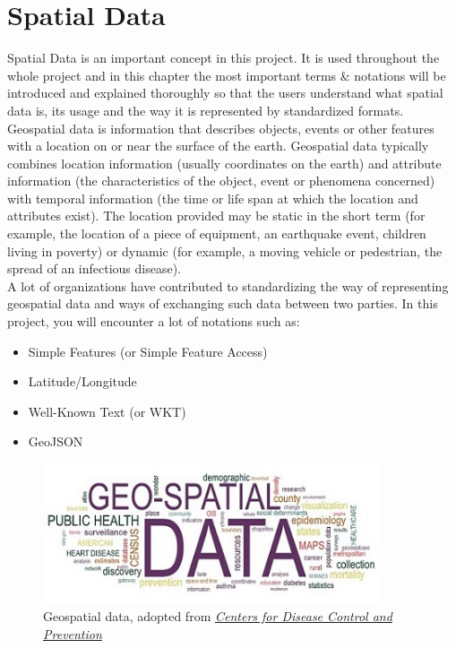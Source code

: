 \chapter{Spatial Data}\label{ch:spatial-data}
Spatial Data is an important concept in this project. It is used throughout the whole project and in this chapter the most
important terms \& notations will be introduced and explained thoroughly so that the users understand what spatial data is,
its usage and the way it is represented by standardized formats.\\
\newline
Geospatial data is information that describes objects, events or other features with a location on
or near the surface of the earth.
Geospatial data typically combines location information (usually coordinates on the earth) and attribute information
(the characteristics of the object, event or phenomena concerned) with temporal information
(the time or life span at which the location and attributes exist).
The location provided may be static in the short term (for example, the location of a piece of equipment,
an earthquake event, children living in poverty) or dynamic
(for example, a moving vehicle or pedestrian, the spread of an infectious disease).~\cite{IBMGeoSpatialData}\\
\newline
A lot of organizations have contributed to standardizing the way of representing geospatial data and ways of
exchanging such data between two parties. In this project, you will encounter a lot of notations such as:
\begin{itemize}
    \item Simple Features (or Simple Feature Access)
    \item Latitude/Longitude
    \item Well-Known Text (or WKT)
    \item GeoJSON
\end{itemize}

\begin{figure}[H]
    \centering
    \includegraphics[width=10cm]{./Figures/Spatial_Data/geospatial_data}
    \caption{Geospatial data, adopted from \href{https://www.cdc.gov/dhdsp/maps/gisx/resources/geo-spatial-data.html}{\textit{Centers for Disease Control and Prevention}}~\cite{CDC}}\label{fig:figure}
\end{figure}
